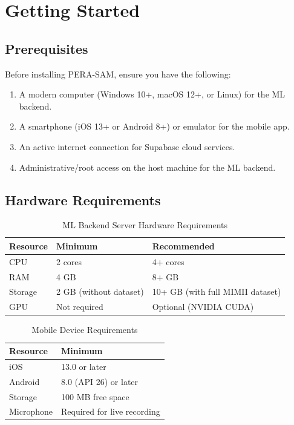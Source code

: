 \documentclass[10pt, a4paper, oneside]{report}
\begin{document}
\chapter{Getting Started}
\label{ch:getting-started}

\section{Prerequisites}
\label{sec:prerequisites}

Before installing PERA-SAM, ensure you have the following:
\begin{enumerate}[leftmargin=*, nosep]
  \item A modern computer (Windows 10+, macOS 12+, or Linux) for the ML backend.
  \item A smartphone (iOS 13+ or Android 8+) or emulator for the mobile app.
  \item An active internet connection for Supabase cloud services.
  \item Administrative/root access on the host machine for the ML backend.
\end{enumerate}

\section{Hardware Requirements}
\label{sec:hardware}

\begin{table}[H]
\centering
\caption{ML Backend Server Hardware Requirements}
\label{tab:hw-backend}
\begin{tabular}{l l l}
  \toprule
  \textbf{Resource} & \textbf{Minimum} & \textbf{Recommended} \\
  \midrule
  CPU     & 2 cores               & 4+ cores \\
  RAM     & 4 GB                  & 8+ GB \\
  Storage & 2 GB (without dataset) & 10+ GB (with full MIMII dataset) \\
  GPU     & Not required          & Optional (NVIDIA CUDA) \\
  \bottomrule
\end{tabular}
\end{table}

\begin{table}[H]
\centering
\caption{Mobile Device Requirements}
\label{tab:hw-mobile}
\begin{tabular}{l l}
  \toprule
  \textbf{Resource} & \textbf{Minimum} \\
  \midrule
  iOS        & 13.0 or later \\
  Android    & 8.0 (API 26) or later \\
  Storage    & 100 MB free space \\
  Microphone & Required for live recording \\
  \bottomrule
\end{tabular}
\end{table}
\end{document}
